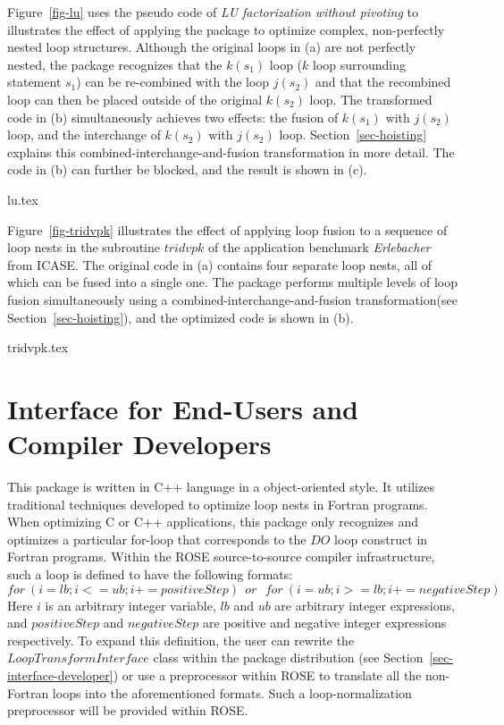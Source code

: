 

Figure~\ref {fig-lu} uses the pseudo code of {\it LU factorization without pivoting}
to illustrates the effect of 
applying the package to optimize complex, non-perfectly nested loop structures. 
Although the original loops in (a) are not perfectly nested, the package recognizes that 
the $k(s_1)$ loop ($k$ loop surrounding statement $s_1$) can be re-combined with 
the loop $j(s_2)$ and that the recombined
loop can then be placed outside of the original $k(s_2)$ loop. The transformed code in 
(b) simultaneously achieves two effects: the fusion of $k(s_1)$ with $j(s_2)$ loop, and
the interchange of $k(s_2)$ with $j(s_2)$ loop. 
Section~\ref {sec-hoisting} explains this combined-interchange-and-fusion
transformation in more detail. 
The code in (b) can further be blocked, and the result is shown in (c). 

 {lu.tex}

Figure~\ref {fig-tridvpk} illustrates the effect of applying loop fusion to 
a sequence of loop nests in the subroutine $tridvpk$ of the application benchmark 
{\it Erlebacher} from ICASE.
The original code in (a) contains four separate loop nests, all of which can be fused 
into a single one. The package performs multiple levels of
loop fusion simultaneously using a combined-interchange-and-fusion 
transformation(see Section~\ref {sec-hoisting}), 
and the optimized code is shown in (b).

 {tridvpk.tex}

\section {Interface for End-Users and Compiler Developers}

This package is written in C++ language in a object-oriented style. 
It utilizes traditional techniques developed to optimize
loop nests in Fortran programs. 
When optimizing C or C++ applications, 
this package only recognizes and optimizes a particular for-loop
that corresponds to the $DO$ loop construct
in Fortran programs. 
Within the ROSE source-to-source compiler infrastructure,
such a loop is defined to have the following formats:
\begin {equation}
for \ (i = lb; i <= ub; i += positiveStep) \ \ or 
\ \ \ for \ (i = ub; i >= lb; i+=negativeStep)
\end {equation}
Here $i$ is an arbitrary integer variable, $lb$ and $ub$ are arbitrary
integer expressions, and $positiveStep$ and $negativeStep$ are positive
and negative integer expressions respectively.
To expand this definition, the user can rewrite the $LoopTransformInterface$ class 
within the package distribution (see Section~\ref {sec-interface-developer}) or
use a preprocessor within ROSE to translate all the non-Fortran loops into
the aforementioned formats.
Such a loop-normalization  preprocessor will be provided within ROSE.

